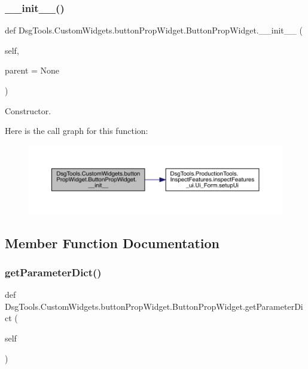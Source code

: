 \subsubsection{\texorpdfstring{\+\_\+\+\_\+init\+\_\+\+\_\+()}{\_\_init\_\_()}}
{\footnotesize\ttfamily def Dsg\+Tools.\+Custom\+Widgets.\+button\+Prop\+Widget.\+Button\+Prop\+Widget.\+\_\+\+\_\+init\+\_\+\+\_\+ (\begin{DoxyParamCaption}\item[{}]{self,  }\item[{}]{parent = {\ttfamily None} }\end{DoxyParamCaption})}

\begin{DoxyVerb}Constructor.\end{DoxyVerb}
 Here is the call graph for this function\+:
\nopagebreak
\begin{figure}[H]
\begin{center}
\leavevmode
\includegraphics[width=350pt]{class_dsg_tools_1_1_custom_widgets_1_1button_prop_widget_1_1_button_prop_widget_af55754fa68c68fe67a6b15c711f0abcd_cgraph}
\end{center}
\end{figure}


\subsection{Member Function Documentation}
\mbox{\label{class_dsg_tools_1_1_custom_widgets_1_1button_prop_widget_1_1_button_prop_widget_a73f5148b469c27df8733366f503a280e}} 
\subsubsection{\texorpdfstring{get\+Parameter\+Dict()}{getParameterDict()}}
{\footnotesize\ttfamily def Dsg\+Tools.\+Custom\+Widgets.\+button\+Prop\+Widget.\+Button\+Prop\+Widget.\+get\+Parameter\+Dict (\begin{DoxyParamCaption}\item[{}]{self }\end{DoxyParamCaption})}


